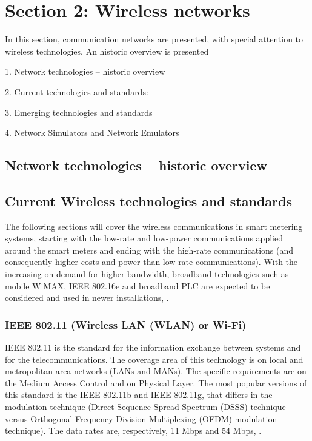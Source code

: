 



\section{Section 2: Wireless networks}

In this section, communication networks are presented, with special attention to wireless technologies. An historic overview is presented 



1.	Network technologies – historic overview

2.	Current technologies and standards:

3.	Emerging technologies and standards

4.	Network Simulators and Network Emulators






\subsection{Network technologies – historic overview}


\subsection{Current Wireless technologies and standards}

The following sections will cover the wireless communications in smart metering systems, starting with the low-rate and low-power communications applied around the smart meters and ending with the high-rate communications (and consequently higher costs and power than low rate communications). With the increasing on demand for higher bandwidth, broadband technologies such as mobile WiMAX, IEEE 802.16e and broadband PLC are expected to be considered and used in newer installations, \cite{Mohassel2014}.



\subsubsection{IEEE 802.11 (Wireless LAN (WLAN) or Wi-Fi)}

IEEE 802.11 is the standard for the information exchange between systems and for the telecommunications. The coverage area of this technology is on local and metropolitan area networks (LANs and MANs). The specific requirements are on the Medium Access Control and on Physical Layer. The most popular versions of this standard is the IEEE 802.11b and IEEE 802.11g, that differs in the modulation technique (Direct Sequence Spread Spectrum (DSSS) technique versus Orthogonal Frequency Division Multiplexing (OFDM) modulation technique). The data rates are, respectively, 11 Mbps and 54 Mbps, \cite{Usman2013, ieee2012}.



